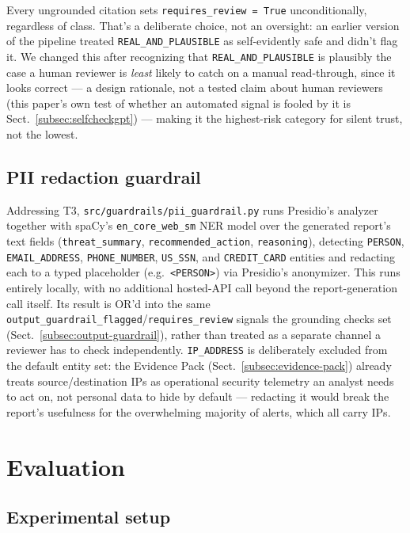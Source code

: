 \documentclass[pdflatex,sn-mathphys-num]{sn-jnl}%
\begin{document}
Every ungrounded citation sets \texttt{requires\_review = True}
unconditionally, regardless of class. That's a deliberate choice, not an
oversight: an earlier version of the pipeline treated
\texttt{REAL\_AND\_PLAUSIBLE} as self-evidently safe and didn't flag it.
We changed this after recognizing that \texttt{REAL\_AND\_PLAUSIBLE} is
plausibly the case a human reviewer is \textit{least} likely to catch on
a manual read-through, since it looks correct --- a design rationale,
not a tested claim about human reviewers (this paper's own test of
whether an automated signal is fooled by it is
Sect.~\ref{subsec:selfcheckgpt}) --- making it the
highest-risk category for silent trust, not the lowest.

\subsection{PII redaction guardrail}\label{subsec:pii-guardrail}

Addressing T3, \texttt{src/guardrails/pii\_guardrail.py} runs Presidio's
analyzer together with spaCy's \texttt{en\_core\_web\_sm} NER model over
the generated report's text fields (\texttt{threat\_summary},
\texttt{recommended\_action}, \texttt{reasoning}), detecting
\texttt{PERSON}, \texttt{EMAIL\_ADDRESS}, \texttt{PHONE\_NUMBER},
\texttt{US\_SSN}, and \texttt{CREDIT\_CARD} entities and redacting each
to a typed placeholder (e.g.\ \texttt{<PERSON>}) via Presidio's
anonymizer. This runs entirely locally, with no additional hosted-API
call beyond the report-generation call itself. Its result is OR'd into
the same \texttt{output\_guardrail\_flagged}/\texttt{requires\_review}
signals the grounding checks set (Sect.~\ref{subsec:output-guardrail}),
rather than treated as a separate channel a reviewer has to check
independently. \texttt{IP\_ADDRESS} is deliberately excluded from the
default entity set: the Evidence Pack (Sect.~\ref{subsec:evidence-pack})
already treats source/destination IPs as operational security telemetry
an analyst needs to act on, not personal data to hide by default ---
redacting it would break the report's usefulness for the overwhelming
majority of alerts, which all carry IPs.

\section{Evaluation}\label{sec:evaluation}

\subsection{Experimental setup}\label{subsec:setup}
\end{document}
